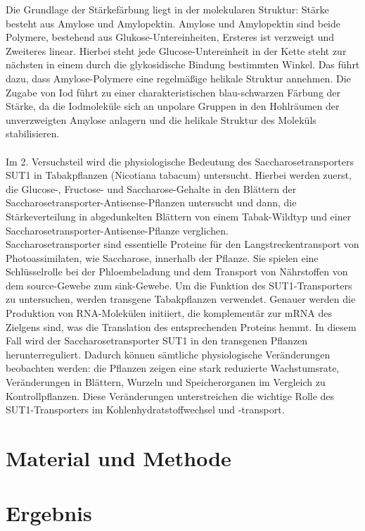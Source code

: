 \documentclass[10pt,a4paper]{article}
\begin{document}
		Die Grundlage der Stärkefärbung liegt in der molekularen Struktur: Stärke besteht aus Amylose und Amylopektin. Amylose und Amylopektin sind beide Polymere, bestehend aus Glukose-Untereinheiten, Ersteres ist verzweigt und Zweiteres linear. Hierbei steht jede Glucose-Untereinheit in der Kette steht zur nächsten in einem durch die glykosidische Bindung bestimmten Winkel. Das führt dazu, dass Amylose-Polymere eine regelmäßige helikale Struktur annehmen. Die Zugabe von Iod führt zu einer charakteristischen blau-schwarzen Färbung der Stärke, da die Iodmoleküle sich an unpolare Gruppen in den Hohlräumen der unverzweigten Amylose anlagern und die helikale Struktur des Moleküls stabilisieren. \\
		\\
		Im 2. Versuchsteil wird die physiologische Bedeutung des Saccharosetransporters SUT1 in Tabakpflanzen (Nicotiana tabacum) untersucht. Hierbei werden zuerst, die Glucose-, Fructose- und Saccharose-Gehalte in den Blättern der Saccharosetransporter-Antisense-Pflanzen untersucht und dann, die Stärkeverteilung in abgedunkelten Blättern von einem Tabak-Wildtyp und einer Saccharosetransporter-Antisense-Pflanze verglichen.\\
		Saccharosetransporter sind essentielle Proteine für den Langstreckentransport von Photoassimilaten, wie Saccharose, innerhalb der Pflanze. Sie spielen eine Schlüsselrolle bei der Phloembeladung und dem Transport von Nährstoffen von dem source-Gewebe zum sink-Gewebe. Um die Funktion des SUT1-Transporters zu untersuchen, werden transgene Tabakpflanzen verwendet. Genauer werden die Produktion von RNA-Molekülen initiiert, die komplementär zur mRNA des Zielgens sind, was die Translation des entsprechenden Proteins hemmt. In diesem Fall wird der Saccharosetransporter SUT1 in den transgenen Pflanzen herunterreguliert. Dadurch können sämtliche physiologische Veränderungen beobachten werden: die Pflanzen zeigen eine stark reduzierte Wachstumsrate, Veränderungen in Blättern, Wurzeln und Speicherorganen im Vergleich zu Kontrollpflanzen. Diese Veränderungen unterstreichen die wichtige Rolle des SUT1-Transporters im Kohlenhydratstoffwechsel und -transport.
	
	\section{Material und Methode}

	
	\section{Ergebnis}
	
\end{document}
